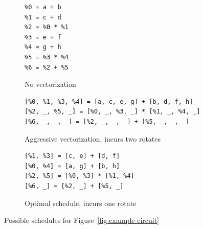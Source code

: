 \begin{figure}
\small
    \begin{subfigure}{0.2\columnwidth}
        \begin{verbatim}
%0 = a + b
%1 = c + d
%2 = %0 * %1
%3 = e + f
%4 = g + h
%5 = %3 * %4
%6 = %2 + %5
        \end{verbatim}
        \vspace{-1em}
        \caption{No vectorization}\label{fig:no-vectorization}
    \end{subfigure}
    \begin{subfigure}{0.6\columnwidth}
        \begin{verbatim}
[%0, %1, %3, %4] = [a, c, e, g] + [b, d, f, h]
[%2, _, %5, _] = [%0, _, %3, _] * [%1, _, %4, _]
[%6, _, _, _] = [%2, _, _, _] + [%5, _, _, _]
        \end{verbatim}
        \vspace{-1em}        
        \caption{Aggressive vectorization, incurs two rotates}\label{fig:aggressive-vectorization}
    \end{subfigure}
    \begin{subfigure}{0.4\columnwidth}
        \begin{verbatim}
[%1, %3] = [c, e] + [d, f]
[%0, %4] = [a, g] + [b, h]
[%2, %5] = [%0, %3] * [%1, %4]
[%6, _] = [%2, _] + [%5, _]
        \end{verbatim}
        \vspace{-1em}        
        \caption{Optimal schedule, incurs one rotate}\label{fig:optimal-schedule}
    \end{subfigure}
    \vspace{-1em}
    \caption{Possible schedules for Figure~\ref{fig:example-circuit}}
\end{figure}

